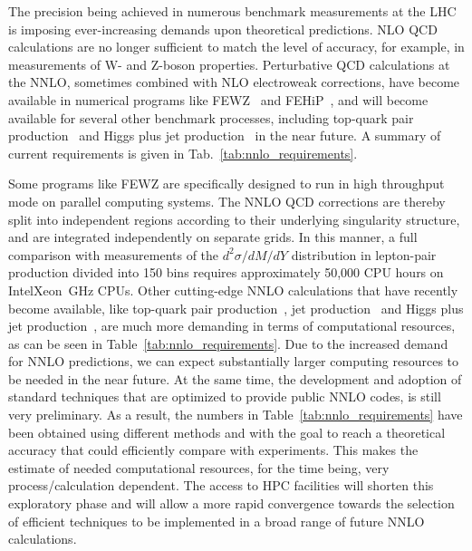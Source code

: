 The precision being achieved in numerous benchmark measurements at the
LHC is imposing ever-increasing demands upon theoretical predictions.
NLO QCD calculations are no longer sufficient to match the level of
accuracy, for example, in measurements of W- and Z-boson properties.
Perturbative QCD calculations at the NNLO, sometimes combined with NLO
electroweak corrections, have become available in numerical programs
like FEWZ~\cite{Melnikov:2006kv,Li:2012wna} and
FEHiP~\cite{Anastasiou:2005qj}, and will become available for several
other benchmark processes, including top-quark pair
production~\cite{Baernreuther:2012ws,Czakon:2013goa} and Higgs plus
jet production~\cite{Boughezal:2013uia} in the near future. A summary 
of current requirements is given in Tab.~\ref{tab:nnlo_requirements}.

Some programs like FEWZ are specifically designed to run in high
throughput mode on parallel computing systems. The NNLO QCD
corrections are thereby split into independent regions according to
their underlying singularity structure, and are integrated
independently on separate grids.  In this manner, a full comparison
with measurements of the $d^2 \sigma/dM/dY$ distribution in
lepton-pair production divided into 150 bins requires approximately
50,000 CPU hours on Intel\registered Xeon~GHz CPUs.
Other cutting-edge NNLO calculations that have recently become
available, like top-quark pair
production~\cite{Baernreuther:2012ws,Czakon:2013goa},
jet production~\cite{Ridder:2013mf} and Higgs plus
jet production~\cite{Boughezal:2013uia}, are much more demanding in
terms of computational resources, as can be seen in
Table~\ref{tab:nnlo_requirements}. Due to the increased demand for
NNLO predictions, we can expect substantially larger computing
resources to be needed in the near future. At the same time, the
development and adoption of standard techniques that
are optimized to provide public NNLO codes, is still very
preliminary. As a result, the numbers in
Table~\ref{tab:nnlo_requirements} have been obtained using different
methods and with the goal to reach a theoretical accuracy that
could efficiently compare with experiments. This makes the estimate
of needed computational resources, for the time being, very
process/calculation dependent. The access to HPC facilities will
shorten this exploratory phase and will allow a more rapid
convergence towards the selection of efficient techniques 
to be implemented in a broad range of future NNLO calculations.

